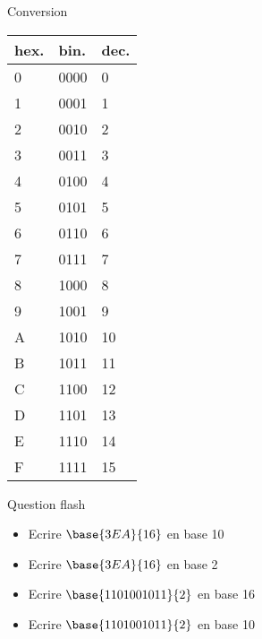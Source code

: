 \documentclass[10pt]{beamer}
\begin{document}
\begin{frame}
	\mframe{\Encodage}
	\begin{block}{Conversion}
		\renewcommand{\arraystretch}{0.8}
		\begin{center}
			\begin{tabularx}{0.4\textwidth}{|X|X|X|}
				\hline
				hex. & bin. & dec. \\
				\hline
				0    & 0000 & 0    \\
				1    & 0001 & 1    \\
				2    & 0010 & 2    \\
				3    & 0011 & 3    \\
				4    & 0100 & 4    \\
				5    & 0101 & 5    \\
				6    & 0110 & 6    \\
				7    & 0111 & 7    \\
				8    & 1000 & 8    \\
				9    & 1001 & 9    \\
				A    & 1010 & 10   \\
				B    & 1011 & 11   \\
				C    & 1100 & 12   \\
				D    & 1101 & 13   \\
				E    & 1110 & 14   \\
				F    & 1111 & 15   \\
				\hline
			\end{tabularx}
		\end{center}
	\end{block}
\end{frame}

\begin{frame}
	\mframe{\Encodage}
	\begin{exampleblock}{\textcolor{yellow}{\flash} {Question flash}}
		\begin{itemize}
			\item<1-> Ecrire $\base{3EA}{16}$ en base 10
			\item<2-> Ecrire $\base{3EA}{16}$ en base 2
			\item<3-> Ecrire $\base{1101001011}{2}$ en base 16
			\item<4-> Ecrire $\base{1101001011}{2}$ en base 10
		\end{itemize}
	\end{exampleblock}
\end{frame}
\end{document}
